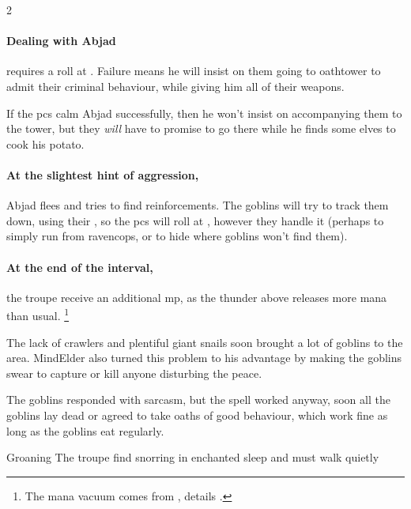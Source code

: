 \begin{multicols}{2}
\paragraph{Dealing with Abjad}
requires a  roll at \tn[9].
Failure means he will insist on them going to \gls{oathtower} to admit their criminal behaviour, while giving him all of their \glspl{weapon}.

If the \glspl{pc} calm Abjad successfully, then he won't insist on accompanying them to the tower, but they \emph{will} have to promise to go there while he finds some elves to cook his potato.

\paragraph{At the slightest hint of aggression,}
Abjad flees and tries to find reinforcements.
The goblins will try to track them down, using their , so the \glspl{pc} will roll at \tn, however they handle it (perhaps  to simply run from \gls{ravencops}, or  to hide where goblins won't find them).

\paragraph{At the end of the \gls{interval},}
the troupe receive an additional \gls{mp}, as the thunder above releases more mana than usual.%
\footnote{The mana vacuum comes from , details .}

\begin{exampletext}
  The lack of \glspl{crawler} and plentiful giant snails soon brought a lot of goblins to the area.
  \Gls{MindElder} also turned this problem to his advantage by making the goblins swear to capture or kill anyone disturbing the peace.

  The goblins responded with sarcasm, but the spell worked anyway, soon all the goblins lay dead or agreed to take oaths of good behaviour, which work fine as long as the goblins eat regularly.
\end{exampletext}

{Groaning }%
{The troupe find  snorring in enchanted sleep and must walk quietly}%



\end{multicols}
